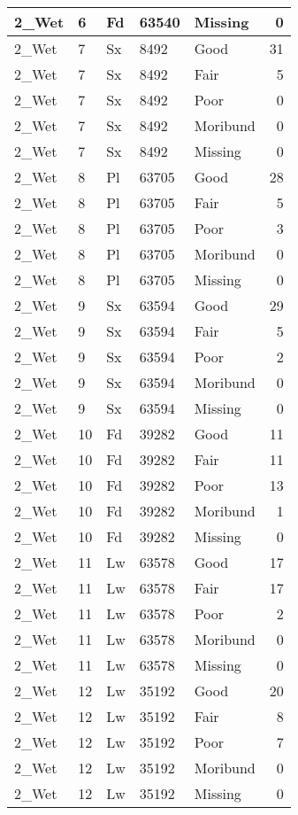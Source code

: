 \documentclass[
]{article}
\begin{document}
\begin{tabular}{l|l|l|l|l|r}
\hline
2\_Wet & 6 & Fd & 63540 & Missing & 0\\
\hline
2\_Wet & 7 & Sx & 8492 & Good & 31\\
\hline
2\_Wet & 7 & Sx & 8492 & Fair & 5\\
\hline
2\_Wet & 7 & Sx & 8492 & Poor & 0\\
\hline
2\_Wet & 7 & Sx & 8492 & Moribund & 0\\
\hline
2\_Wet & 7 & Sx & 8492 & Missing & 0\\
\hline
2\_Wet & 8 & Pl & 63705 & Good & 28\\
\hline
2\_Wet & 8 & Pl & 63705 & Fair & 5\\
\hline
2\_Wet & 8 & Pl & 63705 & Poor & 3\\
\hline
2\_Wet & 8 & Pl & 63705 & Moribund & 0\\
\hline
2\_Wet & 8 & Pl & 63705 & Missing & 0\\
\hline
2\_Wet & 9 & Sx & 63594 & Good & 29\\
\hline
2\_Wet & 9 & Sx & 63594 & Fair & 5\\
\hline
2\_Wet & 9 & Sx & 63594 & Poor & 2\\
\hline
2\_Wet & 9 & Sx & 63594 & Moribund & 0\\
\hline
2\_Wet & 9 & Sx & 63594 & Missing & 0\\
\hline
2\_Wet & 10 & Fd & 39282 & Good & 11\\
\hline
2\_Wet & 10 & Fd & 39282 & Fair & 11\\
\hline
2\_Wet & 10 & Fd & 39282 & Poor & 13\\
\hline
2\_Wet & 10 & Fd & 39282 & Moribund & 1\\
\hline
2\_Wet & 10 & Fd & 39282 & Missing & 0\\
\hline
2\_Wet & 11 & Lw & 63578 & Good & 17\\
\hline
2\_Wet & 11 & Lw & 63578 & Fair & 17\\
\hline
2\_Wet & 11 & Lw & 63578 & Poor & 2\\
\hline
2\_Wet & 11 & Lw & 63578 & Moribund & 0\\
\hline
2\_Wet & 11 & Lw & 63578 & Missing & 0\\
\hline
2\_Wet & 12 & Lw & 35192 & Good & 20\\
\hline
2\_Wet & 12 & Lw & 35192 & Fair & 8\\
\hline
2\_Wet & 12 & Lw & 35192 & Poor & 7\\
\hline
2\_Wet & 12 & Lw & 35192 & Moribund & 0\\
\hline
2\_Wet & 12 & Lw & 35192 & Missing & 0\\

\end{tabular}
\end{document}
